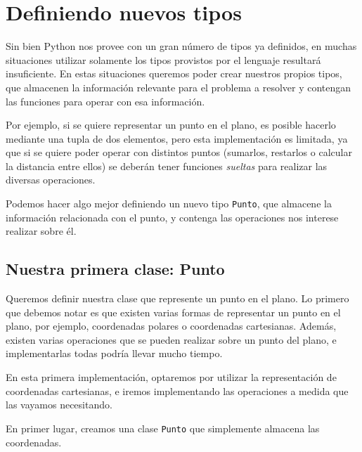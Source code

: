 
\section{Definiendo nuevos tipos}

Sin bien Python nos provee con un gran número de tipos ya definidos, en
muchas situaciones utilizar solamente los tipos provistos por el lenguaje
resultará insuficiente.  En estas situaciones queremos poder crear nuestros
propios tipos, que almacenen la información relevante para el problema a
resolver y contengan las funciones para operar con esa información.

Por ejemplo, si se quiere representar un punto en el plano, es posible
hacerlo mediante una tupla de dos elementos, pero esta implementación es
limitada, ya que si se quiere poder operar con distintos puntos (sumarlos,
restarlos o calcular la distancia entre ellos) se deberán tener funciones
{\it sueltas} para realizar las diversas operaciones.

Podemos hacer algo mejor definiendo un nuevo tipo \lstinline!Punto!, que almacene
la información relacionada con el punto, y contenga las operaciones nos
interese realizar sobre él.

\subsection{Nuestra primera clase: Punto}

Queremos definir nuestra clase que represente un punto en el plano.
Lo primero que debemos notar es que existen varias formas de representar un
punto en el plano, por ejemplo, coordenadas polares o coordenadas
cartesianas.
Además, existen varias operaciones que se pueden realizar sobre un punto
del plano, e implementarlas todas podría llevar mucho tiempo.

En esta primera implementación, optaremos por utilizar la representación de
coordenadas cartesianas, e iremos implementando las operaciones a medida
que las vayamos necesitando.

En primer lugar, creamos una clase \lstinline!Punto! que simplemente
almacena las coordenadas.

